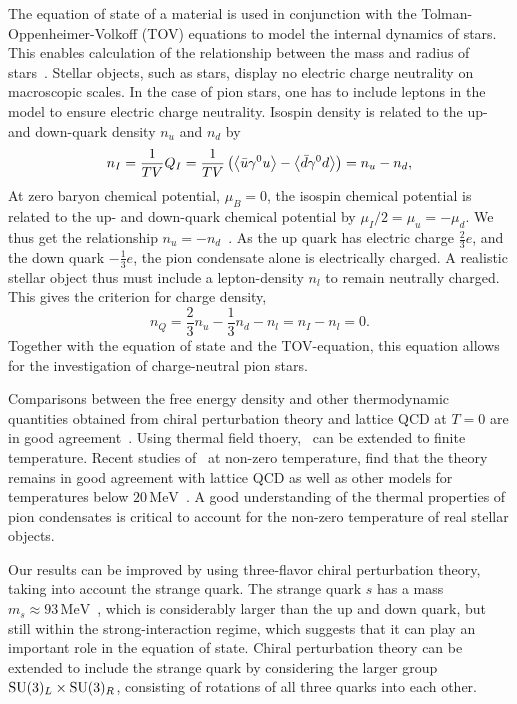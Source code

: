 The equation of state of a material is used in conjunction with the Tolman-Oppenheimer-Volkoff (TOV) equations to model the internal dynamics of stars.
This enables calculation of the relationship between the mass and radius of stars~\cite{Carroll:space-time}.
Stellar objects, such as stars, display no electric charge neutrality on macroscopic scales.
In the case of pion stars, one has to include leptons in the model to ensure electric charge neutrality.
Isospin density is related to the up- and down-quark density $n_u$ and $n_d$ by
\begin{equation}
    n_I 
    = \frac{1}{TV} Q_I 
    = \frac{1}{TV} \left(\ex{\bar u \gamma^0 u} - \ex{\bar d \gamma^0 d} \right) 
    = n_u - n_d,
\end{equation}
At zero baryon chemical potential, $\mu_B = 0$, the isospin chemical potential is related to the up- and down-quark chemical potential by $\mu_I/2 = \mu_u = -\mu_d$.
We thus get the relationship $n_u = -n_d$~\cite{new_clas_of_compact_stars}.
As the up quark has electric charge $\frac{2}{3}e$, and the down quark $-\frac{1}{3}e$, the pion condensate alone is electrically charged.
A realistic stellar object thus must include a lepton-density $n_l$ to remain neutrally charged.
This gives the criterion for charge density,
\begin{equation}
    n_Q = \frac{2}{3}n_u - \frac{1}{3} n_d - n_l = n_I - n_l = 0.
\end{equation}
Together with the equation of state and the TOV-equation, this equation allows for the investigation of charge-neutral pion stars.

Comparisons between the free energy density and other thermodynamic quantities obtained from chiral perturbation theory and lattice QCD at $T = 0$ are in good agreement~\cite{Andersen:two-flavor-chpt,mojahed}.
Using thermal field thoery, \chpt\, can be extended to finite temperature.
Recent studies of \chpt\, at non-zero temperature, find that the theory remains in good agreement with lattice QCD as well as other models for temperatures below $20 \, \text{MeV}$~\cite{andersen_mojahed:condensates_and_pressure}.
A good understanding of the thermal properties of pion condensates is critical to account for the non-zero temperature of real stellar objects.

Our results can be improved by using three-flavor chiral perturbation theory, taking into account the strange quark.
The strange quark $s$ has a mass $m_s \approx 93 \, \text{MeV}$~\cite{PDG}, which is considerably larger than the up and down quark, but still within the strong-interaction regime, which suggests that it can play an important role in the equation of state.
Chiral perturbation theory can be extended to include the strange quark by considering the larger group $\mathrm{SU}(3)_L \times \mathrm{SU}(3)_R$, consisting of rotations of all three quarks into each other.
